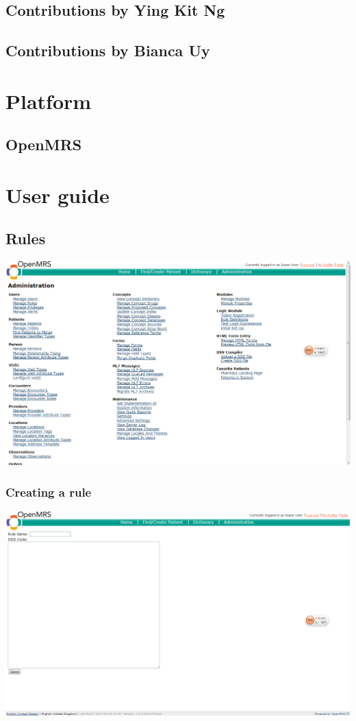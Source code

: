 \documentclass[12pt,letterpaper]{article}
\begin{document}
\subsection{Contributions by Ying Kit Ng}

\subsection{Contributions by Bianca Uy}


\newpage 
\section{Platform}

\subsection{OpenMRS}

\newpage 
\section{User guide}

\subsection{Rules}

\includegraphics[width=6.5in]{administration.png}

\subsubsection{Creating a rule}

\includegraphics[width=6.5in]{createDSSProgram.png}
\end{document}
